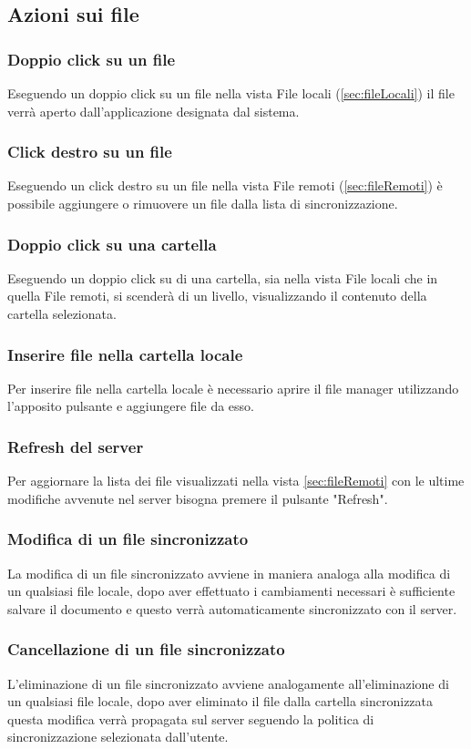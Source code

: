 \subsection{Azioni sui file}
\label{sec:fileActions}

\subsubsection{Doppio click su un file}
Eseguendo un doppio click su un file nella vista File locali (\ref{sec:fileLocali}) il file verrà aperto dall'applicazione designata dal sistema.
\subsubsection{Click destro su un file}
Eseguendo un click destro su un file nella vista File remoti (\ref{sec:fileRemoti}) è possibile aggiungere o rimuovere un file dalla lista di sincronizzazione.  
\subsubsection{Doppio click su una cartella}
Eseguendo un doppio click su di una cartella, sia nella vista File locali che in quella File remoti, si scenderà di un livello, visualizzando il contenuto della cartella selezionata.
\subsubsection{Inserire file nella cartella locale}
Per inserire file nella cartella locale è necessario aprire il file manager utilizzando l'apposito pulsante e aggiungere file da esso.
\subsubsection{Refresh del server}
Per aggiornare la lista dei file visualizzati nella vista \ref{sec:fileRemoti} con le ultime modifiche avvenute nel server bisogna premere il pulsante "Refresh".
\subsubsection{Modifica di un file sincronizzato}
La modifica di un file sincronizzato avviene in maniera analoga alla modifica di un qualsiasi file locale, dopo aver effettuato i cambiamenti necessari è sufficiente salvare il documento e questo verrà automaticamente sincronizzato con il server.
\subsubsection{Cancellazione di un file sincronizzato}
L'eliminazione di un file sincronizzato avviene analogamente all'eliminazione di un qualsiasi file locale, dopo aver eliminato il file dalla cartella sincronizzata questa modifica verrà propagata sul server seguendo la politica di sincronizzazione selezionata dall'utente.

